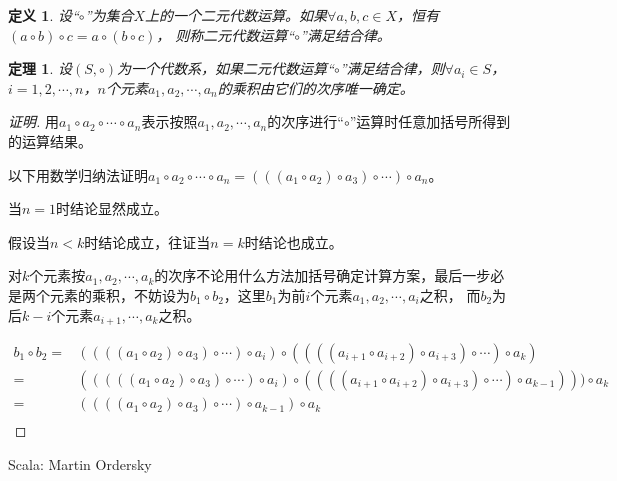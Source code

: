 \documentclass{article}
\newtheorem{Def}{定义}
\newtheorem{Thm}{定理}
\begin{document}
\begin{CJK*}{UTF8}{gbsn}
  \begin{Def}
    设“$\circ$”为集合$X$上的一个二元代数运算。如果$\forall a, b, c \in X$，恒有$(a \circ b) \circ c = a \circ (b \circ c)$， 则称二元代数运算“$\circ$”满足结合律。
  \end{Def}
\begin{Thm}
  设$(S,\circ)$为一个代数系，如果二元代数运算“$\circ$”满足结合律，则$\forall a_i\in S$，$i=1,2,\cdots,n$，$n$个元素$a_1,a_2,\cdots,a_n$的乘积由它们的次序唯一确定。
\end{Thm}
\begin{proof}[证明]
  用$a_1\circ a_2\circ \cdots \circ a_n$表示按照$a_1,a_2, \cdots, a_n$的次序进行“$\circ$”运算时任意加括号所得到的运算结果。

  以下用数学归纳法证明$a_1\circ a_2\circ \cdots \circ a_n=(((a_1\circ a_2)\circ a_3)\circ \cdots )\circ a_n$。

  当$n=1$时结论显然成立。

  假设当$n<k$时结论成立，往证当$n=k$时结论也成立。

  对$k$个元素按$a_1,a_2,\cdots,a_k$的次序不论用什么方法加括号确定计算方案，最后一步必是两个元素的乘积，不妨设为$b_1\circ b_2$，这里$b_1$为前$i$个元素$a_1,a_2,\cdots,a_i$之积，
  而$b_2$为后$k-i$个元素$a_{i+1},\cdots,a_k$之积。

  \begin{align*}
    b_1\circ b_2 = &((((a_1\circ a_2)\circ a_3)\circ \cdots )\circ a_i)\circ ((((a_{i+1}\circ a_{i+2})\circ a_{i+3})\circ \cdots )\circ a_k)\\
                = &(((((a_1\circ a_2)\circ a_3)\circ \cdots )\circ a_i)\circ ((((a_{i+1}\circ a_{i+2})\circ a_{i+3})\circ \cdots )\circ a_{k-1})))\circ a_k\\
                =&((((a_1\circ a_2)\circ a_3)\circ \cdots )\circ a_{k-1})\circ a_k\\
  \end{align*}
\end{proof}

Scala: Martin Ordersky


\end{CJK*}
\end{document}
